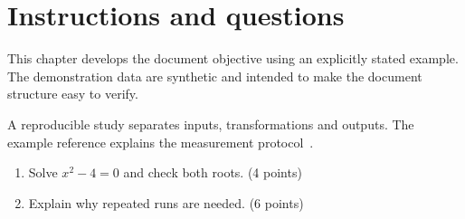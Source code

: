 \section{Instructions and questions}


\label{sec:chapter1}
This chapter develops the document objective using an explicitly stated example. The demonstration data are synthetic and intended to make the document structure easy to verify.

A reproducible study separates inputs, transformations and outputs. The example reference explains the measurement protocol~\cite{example}.
\begin{enumerate}
\item Solve $x^2-4=0$ and check both roots. (4 points)
\item Explain why repeated runs are needed. (6 points)
\end{enumerate}

